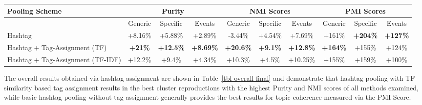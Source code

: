 \documentclass{sig-alternate}
\begin{document}
\begin{table*}[t!]
\vspace{-4mm}
\caption{ Overall percentage improvement of hashtag pooling variants over unpooled scheme.}\label{tbl-overall-final}
\centering
\resizebox{17.5cm}{!} 
{
        \begin{tabular}{|l|ccc|ccc|ccc|}
        \hline
        Pooling Scheme  & \multicolumn {3}{c}{Purity} & \multicolumn {3}{c}{NMI Scores} & \multicolumn {3}{c|}{PMI Scores}\\
        \hline
         & Generic & Specific & Events &  Generic & Specific & Events &  Generic & Specific & Events\\
        \hline
        Hashtag & +8.16\% & +5.88\% & +2.89\% & -3.44\% & +4.54\% & +7.69\% & +161\% & \textbf{+204\%} & \textbf{+127\%} \\
        \hline
        Hashtag + Tag-Assignment (TF) & \textbf{+21\%} & \textbf{+12.5\%} & \textbf{+8.69\%} & \textbf{+20.6\%} & \textbf{+9.1\%} & \textbf{+12.8\%} & \textbf{+164\%} & +155\% & +124\% \\
        \hline
        Hashtag + Tag-Assignment (TF-IDF) & +12.2\% & +9.4\% & +4.34\% & +10.3\% & +4.5\% & +10.25\% & +155\% & +159\% & +100\% \\
        \hline
        \end{tabular}
}
\end{table*}

The overall results obtained via hashtag assignment are shown in
Table~\ref{tbl-overall-final} and demonstrate that hashtag pooling
with TF-similarity based tag assignment results in the best cluster
reproductions with the highest Purity and NMI scores of all methods
examined, while basic hashtag pooling without tag assignment generally
provides the best results for topic coherence measured via the PMI
Score.

\end{document}

